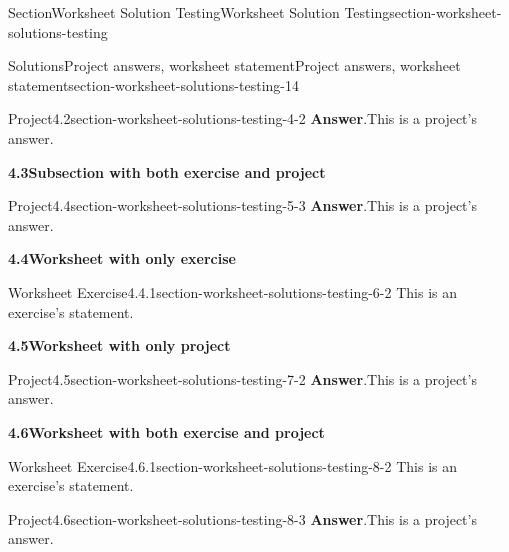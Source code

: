 \documentclass[oneside,10pt,]{article}
\newcommand{\blocktitlefont}{\relax}
\numberwithin{equation}{section}
\begin{document}
\begin{sectionptx}{Section}{Worksheet Solution Testing}{}{Worksheet Solution Testing}{}{}{section-worksheet-solutions-testing}
\begin{solutions-subsection}{Solutions}{Project answers, worksheet statement}{}{Project answers, worksheet statement}{}{}{section-worksheet-solutions-testing-14}
\begin{projectsolution}{Project}{4.2}{}{section-worksheet-solutions-testing-4-2}%
\noindent\textbf{\blocktitlefont Answer}.\hypertarget{section-worksheet-solutions-testing-4-2-2-main}{}\quad{}This is a project's answer.%
\end{projectsolution}%
\par\medskip
\noindent\textbf{\normalsize{}4.3\space\textperiodcentered\space{}Subsection with both exercise and project}
\begin{projectsolution}{Project}{4.4}{}{section-worksheet-solutions-testing-5-3}%
\noindent\textbf{\blocktitlefont Answer}.\hypertarget{section-worksheet-solutions-testing-5-3-2-main}{}\quad{}This is a project's answer.%
\end{projectsolution}%
\par\medskip
\noindent\textbf{\normalsize{}4.4\space\textperiodcentered\space{}Worksheet with only exercise}
\begin{divisionsolution}{Worksheet Exercise}{4.4.1}{}{section-worksheet-solutions-testing-6-2}%
This is an exercise's statement.%
\end{divisionsolution}%
\par\medskip
\noindent\textbf{\normalsize{}4.5\space\textperiodcentered\space{}Worksheet with only project}
\begin{projectsolution}{Project}{4.5}{}{section-worksheet-solutions-testing-7-2}%
\noindent\textbf{\blocktitlefont Answer}.\hypertarget{section-worksheet-solutions-testing-7-2-2-main}{}\quad{}This is a project's answer.%
\end{projectsolution}%
\par\medskip
\noindent\textbf{\normalsize{}4.6\space\textperiodcentered\space{}Worksheet with both exercise and project}
\begin{divisionsolution}{Worksheet Exercise}{4.6.1}{}{section-worksheet-solutions-testing-8-2}%
This is an exercise's statement.%
\end{divisionsolution}%
\begin{projectsolution}{Project}{4.6}{}{section-worksheet-solutions-testing-8-3}%
\noindent\textbf{\blocktitlefont Answer}.\hypertarget{section-worksheet-solutions-testing-8-3-2-main}{}\quad{}This is a project's answer.%
\end{projectsolution}%
\end{solutions-subsection}
%
%
\typeout{************************************************}
\typeout{************************************************}

\end{sectionptx}
\end{document}
